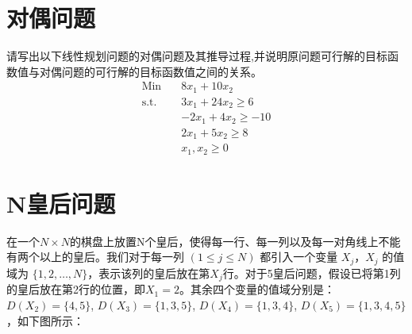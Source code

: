 \documentclass{article}
\begin{document}
\newpage
\section*{对偶问题}
请写出以下线性规划问题的对偶问题及其推导过程,并说明原问题可行解的目标函数值与对偶问题的可行解的目标函数值之间的关系。
\begin{align*}
\text{Min} \quad & 8x_1 + 10x_2 \\
\text{s.t.} \quad & 3x_1 + 24x_2 \ge 6 \\
& -2x_1 + 4x_2 \ge -10 \\
& 2x_1 + 5x_2 \ge 8 \\
& x_1, x_2 \ge 0
\end{align*}

\newpage
\section*{N皇后问题}
在一个$N \times N$的棋盘上放置N个皇后，使得每一行、每一列以及每一对角线上不能有两个以上的皇后。我们对于每一列 $(1 \le j \le N)$ 都引入一个变量 $X_j$，$X_j$ 的值域为 $\{1,2,\dots,N\}$，表示该列的皇后放在第$X_j$行。对于5皇后问题，假设已将第1列的皇后放在第2行的位置，即$X_1=2$。其余四个变量的值域分别是：$D(X_2)=\{4,5\}$, $D(X_3)=\{1,3,5\}$, $D(X_4)=\{1,3,4\}$, $D(X_5)=\{1,3,4,5\}$，如下图所示：
\end{document}
